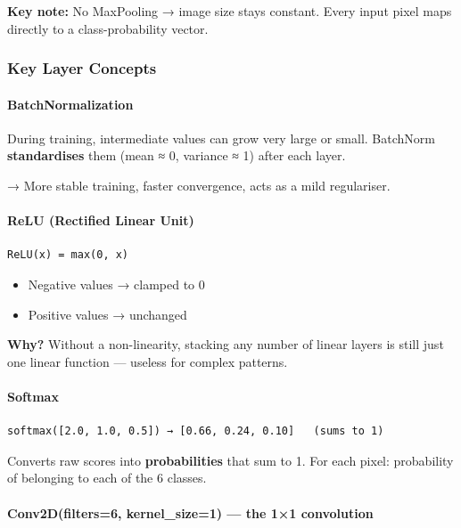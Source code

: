 \documentclass[11pt]{article}
\providecommand{\tightlist}{%
      \setlength{\itemsep}{0pt}\setlength{\parskip}{0pt}}
\begin{document}
\textbf{Key note:} No MaxPooling → image size stays constant. Every
input pixel maps directly to a class-probability vector.

    \subsubsection{Key Layer Concepts}\label{key-layer-concepts}

\paragraph{BatchNormalization}\label{batchnormalization}

During training, intermediate values can grow very large or small.
BatchNorm \textbf{standardises} them (mean ≈ 0, variance ≈ 1) after each
layer.

→ More stable training, faster convergence, acts as a mild regulariser.

\paragraph{ReLU (Rectified Linear
Unit)}\label{relu-rectified-linear-unit}

\begin{verbatim}
ReLU(x) = max(0, x)
\end{verbatim}

\begin{itemize}
\tightlist
\item
  Negative values → clamped to 0
\item
  Positive values → unchanged
\end{itemize}

\textbf{Why?} Without a non-linearity, stacking any number of linear
layers is still just one linear function --- useless for complex
patterns.

\paragraph{Softmax}\label{softmax}

\begin{verbatim}
softmax([2.0, 1.0, 0.5]) → [0.66, 0.24, 0.10]   (sums to 1)
\end{verbatim}

Converts raw scores into \textbf{probabilities} that sum to 1. For each
pixel: probability of belonging to each of the 6 classes.

\paragraph{Conv2D(filters=6, kernel\_size=1) --- the 1×1
convolution}\label{conv2dfilters6-kernel_size1-the-11-convolution}
\end{document}
